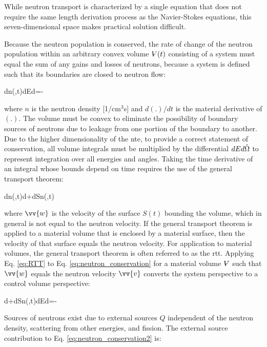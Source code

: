While neutron transport is characterized by a single equation that does not require the same length derivation process as the Navier-Stokes equations, this seven-dimensional space makes practical solution difficult. 

Because the neutron population is conserved, the rate of change of the neutron population within an arbitrary convex volume \(\volume(t)\) consisting of a system must equal the sum of any gains and losses of neutrons, because a system is defined such that its boundaries are closed to neutron flow:

\beq
\label{eq:neutron_conservation}
\left\lbrack{}\int d\volume n(,t)\right\rbrack dEd\hO=-
\eeq

where \(n\) is the neutron density [1/cm$^3$s] and \(d(.)/dt\) is the material derivative of \((.)\). The volume must be convex to eliminate the possibility of boundary sources of neutrons due to leakage from one portion of the boundary to another. Due to the higher dimensionality of the \gls{nte}, to provide a correct statement of conservation, all volume integrals must be multiplied by the differential \(dEd\hat{\Omega}\) to represent integration over all energies and angles. Taking the time derivative of an integral whose bounds depend on time requires the use of the general transport theorem:

\beq
\label{eq:RTT}
\int d\volume n(,t)\equiv\int d\volume{}+\int dSn(,t)\cdot{}
\eeq

where \(\vv{w}\) is the velocity of the surface \(S(t)\) bounding the volume, which in general is not equal to the neutron velocity. If the general transport theorem is applied to a material volume that is enclosed by a material surface, then the velocity of that surface equals the neutron velocity. For application to material volumes, the general transport theorem is often referred to as the \gls{rtt}. Applying Eq. \eqref{eq:RTT} to Eq. \eqref{eq:neutron_conservation} for a material volume \(\volume\) such that \(\vv{w}\) equals the neutron velocity \(\vv{v}\) converts the system perspective to a control volume perspective:

\beq
\label{eq:neutron_conservation2}
\left\lbrack\int d\volume{}+\int dSn(,t)\cdot{}\right\rbrack dEd\hO=-
\eeq

Sources of neutrons exist due to external sources \(Q\) independent of the neutron density, scattering from other energies, and fission. The external source contribution to Eq. \eqref{eq:neutron_conservation2} is:

